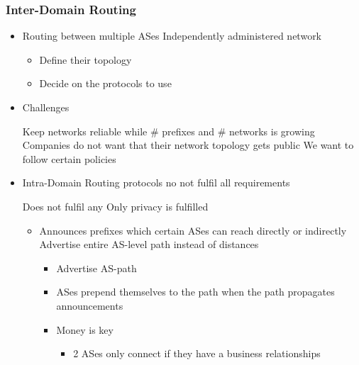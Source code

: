\subsubsection{Inter-Domain Routing}
\begin{itemize}
    \item Routing between multiple ASes
     Independently administered network
        \begin{itemize}
            \item Define their topology
            \item Decide on the protocols to use
        \end{itemize}
    \item Challenges
        \begin{itemize}
             Keep networks reliable while $\#$ prefixes and $\#$ networks is growing
             Companies do not want that their network topology gets public
             We want to follow certain policies
        \end{itemize}
    \item Intra-Domain Routing protocols no not fulfil all requirements
        \begin{itemize}
             Does not fulfil any
             Only privacy is fulfilled
        \end{itemize}
        \begin{itemize}
            \item Announces prefixes which certain ASes can reach directly or indirectly
             Advertise entire AS-level path instead of distances
                \begin{itemize}
                    \item Advertise AS-path
                    \item ASes prepend themselves to the path when the path propagates announcements
                \end{itemize}
                \begin{itemize}
                    \item Money is key
                        \begin{itemize}
                            \item 2 ASes only connect if they have a business relationships

\end{itemize}
\end{itemize}
\end{itemize}
\end{itemize}
